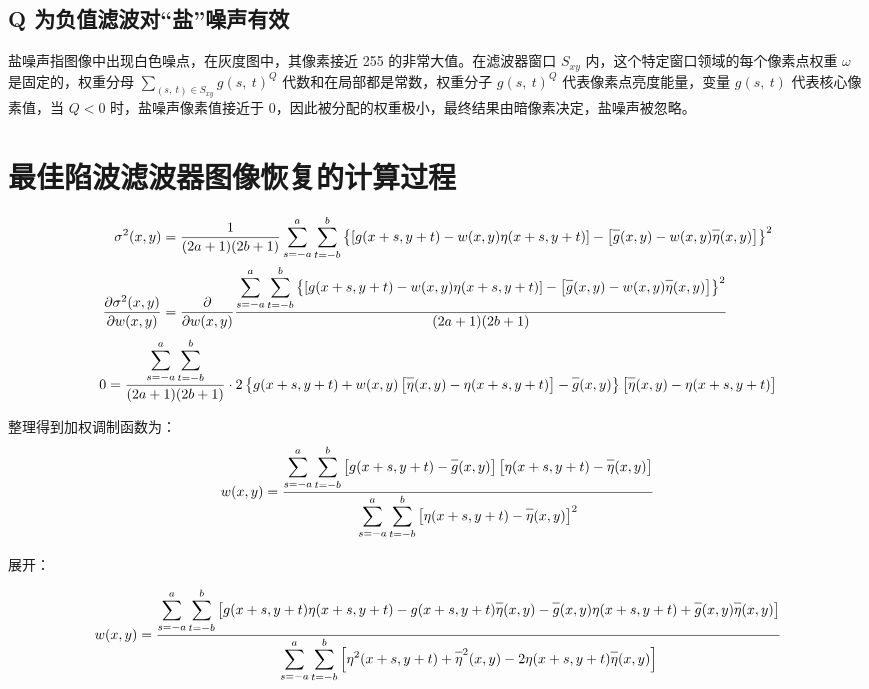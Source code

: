 \documentclass{article}
\newcommand{\piff}[2]{\dfrac{\partial{#1}}{\partial{#2}}}
\newcommand{\barline}[1]{\overline{#1\rule{0pt}{1.5ex}}}
\begin{document}
\subsection{Q 为负值滤波对“盐”噪声有效}
盐噪声指图像中出现白色噪点，在灰度图中，其像素接近 255 的非常大值。在滤波器窗口 $S_{xy}$ 内，这个特定窗口领域的每个像素点权重 $\omega$ 是固定的，权重分母 $\displaystyle\sum\limits_{(s,\ t)\in S_{xy}}g(s,\ t)^Q$ 代数和在局部都是常数，权重分子 $g(s,\ t)^Q$ 代表像素点亮度能量，变量 $g(s,\ t)$ 代表核心像素值，当 $Q<0$ 时，盐噪声像素值接近于 0，因此被分配的权重极小，最终结果由暗像素决定，盐噪声被忽略。



\section{最佳陷波滤波器图像恢复的计算过程}
\begin{footnotesize}
    \begin{align*}
        \sigma^2(x,y)&=\dfrac{1}{(2a+1)(2b+1)}\sum_{s=-a}^{a}\sum_{t=-b}^{b}\left\{\left[g(x+s,y+t)-w(x,y)\eta(x+s,y+t)\right]-\left[\barline{g}(x,y)-w(x,y)\barline{\eta}(x,y)\right]\right\}^2
        \\
        \piff{\sigma^2(x,y)}{w(x,y)}&=\piff{}{w(x,y)}\dfrac{\displaystyle\sum_{s=-a}^{a}\sum_{t=-b}^{b}\left\{\left[g(x+s,y+t)-w(x,y)\eta(x+s,y+t)\right]-\left[\barline{g}(x,y)-w(x,y)\barline{\eta}(x,y)\right]\right\}^2}{(2a+1)(2b+1)}
    \end{align*}
    \[ 0=\dfrac{\displaystyle\sum_{s=-a}^{a}\sum_{t=-b}^{b}}{(2a+1)(2b+1)}\cdot2\left\{g(x+s,y+t)+w(x,y)\left[\barline{\eta}(x,y)-\eta(x+s,y+t)\right]-\barline{g}(x,y)\right\}\left[\barline{\eta}(x,y)-\eta(x+s,y+t)\right] \]
\end{footnotesize}\vspace*{-1em}

整理得到加权调制函数为：
\begin{align*}
    w(x,y)=\dfrac{\displaystyle\sum_{s=-a}^{a}\sum_{t=-b}^{b}\left[g(x+s,y+t)-\barline{g}(x,y)\right]\left[\eta(x+s,y+t)-\barline{\eta}(x,y)\right]}{\displaystyle\sum_{s=-a}^{a}\sum_{t=-b}^{b}\left[\eta(x+s,y+t)-\barline{\eta}(x,y)\right]^2}
\end{align*}

展开：
\begin{footnotesize}
    \begin{align*}
        w(x,y)=\dfrac{\displaystyle\sum_{s=-a}^{a}\sum_{t=-b}^{b}\left[g(x+s,y+t)\eta(x+s,y+t)-g(x+s,y+t)\barline{\eta}(x,y)-\barline{g}(x,y)\eta(x+s,y+t)+\barline{g}(x,y)\barline{\eta}(x,y)\right]}{\displaystyle\sum_{s=-a}^{a}\sum_{t=-b}^{b}\left[\eta^2(x+s,y+t)+\barline{\eta}^2(x,y)-2\eta(x+s,y+t)\barline{\eta}(x,y)\right]}
    \end{align*}
\end{footnotesize}
\end{document}
